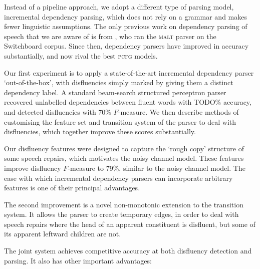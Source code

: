 \documentclass[11pt,letterpaper]{article}
\newcommand{\pcfg}{\textsc{pcfg}\xspace}
\begin{document}
Instead of a pipeline approach, we adopt a different type of parsing model,
incremental dependency parsing,
which does not rely on a grammar and makes fewer linguistic assumptions.
The only previous work on dependency parsing of speech that we are aware of
is from \citet{jorgensen:07}, who ran the \textsc{malt} parser on the Switchboard
corpus. Since then, dependency parsers have improved in accuracy substantially,
and now rival the best \pcfg models.

Our first experiment is to apply a state-of-the-art incremental dependency parser
`out-of-the-box', with disfluencies simply marked by giving them a distinct
dependency label. A standard beam-search structured perceptron parser
\citep{zhang:cl11,zhang:11} recovered unlabelled dependencies between fluent words
with TODO\% accuracy, and detected disfluencies with 70\% $F$-measure.
We then describe methods of customising the feature set and transition system
of the parser to deal with disfluencies, which together improve these scores
substantially.

Our disfluency features were designed to capture the
`rough copy' structure of some speech repairs, which motivates the
\citet{Johnson04a} noisy channel model.  These features improve disfluency
$F$-measure to 79\%, similar to the noisy channel model.  The ease with which
incremental dependency parsers can incorporate arbitrary features is one of
their principal advantages.

The second improvement is a novel non-monotonic extension to the transition
system. It allows the parser to create temporary edges, in order to deal with
speech repairs where the head of an apparent constituent is disfluent, but some
of its apparent leftward children are not.

The joint system achieves competitive accuracy at both disfluency detection and
parsing. It also has other important advantages:
\end{document}
